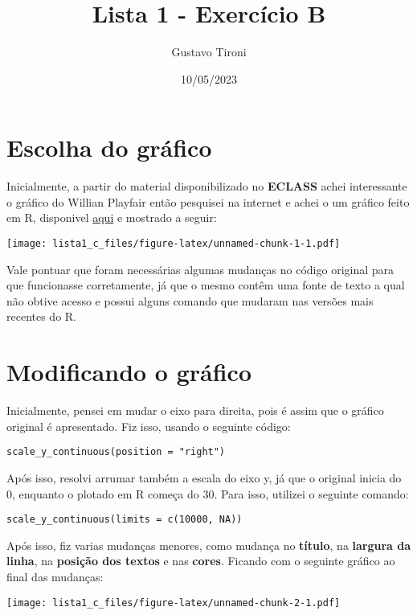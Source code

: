 \documentclass[
]{article}
\title{Lista 1 - Exercício B}
\author{Gustavo Tironi}
\date{10/05/2023}
\begin{document}
\maketitle

{
\setcounter{tocdepth}{2}
\tableofcontents
}
\hypertarget{escolha-do-gruxe1fico}{%
\section{Escolha do gráfico}\label{escolha-do-gruxe1fico}}

Inicialmente, a partir do material disponibilizado no \textbf{ECLASS}
achei interessante o gráfico do Willian Playfair então pesquisei na
internet e achei o um gráfico feito em R, disponivel
\href{https://github.com/carloscinelli/Blog-Scripts}{aqui} e mostrado a
seguir:

\texttt{[image: lista1\_c\_files/figure-latex/unnamed-chunk-1-1.pdf]}

Vale pontuar que foram necessárias algumas mudanças no código original
para que funcionasse corretamente, já que o mesmo contêm uma fonte de
texto a qual não obtive acesso e possui alguns comando que mudaram nas
versões mais recentes do R.

\hypertarget{modificando-o-gruxe1fico}{%
\section{Modificando o gráfico}\label{modificando-o-gruxe1fico}}

Inicialmente, pensei em mudar o eixo para direita, pois é assim que o
gráfico original é apresentado. Fiz isso, usando o seguinte código:

\begin{verbatim}
scale_y_continuous(position = "right")
\end{verbatim}

Após isso, resolvi arrumar também a escala do eixo y, já que o original
inicia do 0, enquanto o plotado em R começa do 30. Para isso, utilizei o
seguinte comando:

\begin{verbatim}
scale_y_continuous(limits = c(10000, NA))
\end{verbatim}

Após isso, fiz varias mudanças menores, como mudança no \textbf{título},
na \textbf{largura da linha}, na \textbf{posição dos textos} e nas
\textbf{cores}. Ficando com o seguinte gráfico ao final das mudanças:

\texttt{[image: lista1\_c\_files/figure-latex/unnamed-chunk-2-1.pdf]}
\end{document}
